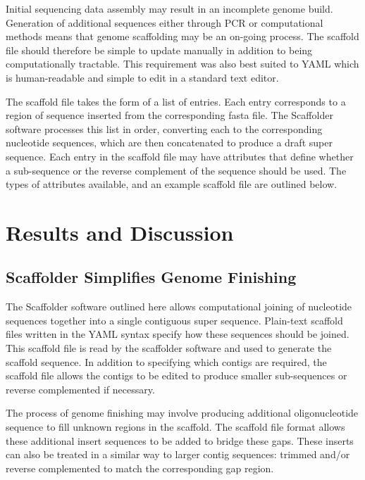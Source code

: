 \documentclass[10pt]{bmc_article}
\newenvironment{bmcformat}{\begin{raggedright}\baselineskip20pt\sloppy\setboolean{publ}{false}}{\end{raggedright}\baselineskip20pt\sloppy}
\begin{document}
\begin{bmcformat}
Initial sequencing data assembly may result in an incomplete genome build.
Generation of additional sequences either through PCR or computational methods
means that genome scaffolding may be an on-going process. The scaffold file
should therefore be simple to update manually in addition to being
computationally tractable. This requirement was also best suited to YAML which
is human-readable and simple to edit in a standard text editor. \pb

The scaffold file takes the form of a list of entries. Each entry corresponds
to a region of sequence inserted from the corresponding fasta file. The
Scaffolder software processes this list in order, converting each to the
corresponding nucleotide sequences, which are then concatenated to produce
a draft super sequence. Each entry in the scaffold file may have attributes
that define whether a sub-sequence or the reverse complement of the sequence
should be used. The types of attributes available, and an example scaffold file
are outlined below. \pb

\clearpage

\section*{Results and Discussion} %

\subsection*{Scaffolder Simplifies Genome Finishing} %

The Scaffolder software outlined here allows computational joining of
nucleotide sequences together into a single contiguous super sequence.
Plain-text scaffold files written in the YAML syntax specify how these
sequences should be joined. This scaffold file is read by the scaffolder
software and used to generate the scaffold sequence. In addition to specifying
which contigs are required, the scaffold file allows the contigs to be edited
to produce smaller sub-sequences or reverse complemented if necessary. \pb

The process of genome finishing may involve producing additional
oligonucleotide sequence to fill unknown regions in the scaffold. The scaffold
file format allows these additional insert sequences to be added to bridge
these gaps. These inserts can also be treated in a similar way to larger contig
sequences: trimmed and/or reverse complemented to match the corresponding gap
region. \pb


\end{bmcformat}
\end{document}
